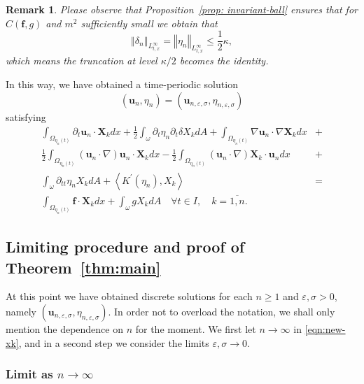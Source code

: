 \documentclass[10pt,a4paper]{article}
\newtheorem{remark}[theorem]{Remark}
\numberwithin{equation}{section}
\begin{document}
\begin{remark}
Please  observe that Proposition~\ref{prop: invariant-ball} ensures that for  $C\left(\mathbf{f},g\right)$ and $m^{2}$ sufficiently small  we obtain that
\[\left\Vert \delta_{n}\right\Vert _{L_{t,x}^{\infty}}=\left\Vert \eta_{n}\right\Vert _{L_{t,x}^{\infty}}\le \frac{1}{2}\kappa,\]
which means the truncation at level $\kappa/2$ becomes the identity.
\end{remark}
 In this way, we have obtained a time-periodic solution 
 \[
\left(\mathbf{u}_{n},\eta_{n}\right)=\left(\mathbf{u}_{n,\varepsilon,\sigma},\eta_{n,\varepsilon,\sigma}\right)
\] satisfying
\begin{equation}\label{eqn:new-xk}
\begin{aligned}\int_{\Omega_{\eta_{n}\left(t\right)}}\partial_{t}\mathbf{u}_{n}\cdot\mathbf{X}_{k}dx+\frac{1}{2}\int_{\omega}\partial_{t}\eta_{n}\partial_{t}\delta X_{k}dA+\int_{\Omega_{\eta_{n}\left(t\right)}}\nabla\mathbf{u}_{n}\cdot\nabla\mathbf{X}_{k}dx & +\\
\frac{1}{2}\int_{\Omega_{\eta_{n}\left(t\right)}}\left(\mathbf{u}_{n}\cdot\nabla\right)\mathbf{u}_{n}\cdot\mathbf{X}_{k}dx-\frac{1}{2}\int_{\Omega_{\eta_{n}\left(t\right)}}\left(\mathbf{u}_{n}\cdot\nabla\right)\mathbf{X}_{k}\cdot\mathbf{u}_{n}dx & +\\
\int_{\omega}\partial_{tt}\eta_{n}X_{k}dA+\left\langle K^{\prime}\left(\eta_{n}\right),X_{k}\right\rangle  & =\\
\int_{\Omega_{\eta_{n}\left(t\right)}}\mathbf{f}\cdot\mathbf{X}_{k}dx+\int_{\omega}gX_{k}dA\quad\forall t\in I,\quad k=\overline{1,n}.
\end{aligned}
\end{equation}

\subsection{Limiting procedure and proof of Theorem~\ref{thm:main}}\label{ssect:chap02-limit-compactness}
At this point we have obtained discrete solutions for each $n \ge 1$ and $\varepsilon, \sigma>0$, namely $\left(\mathbf{u}_{n,\varepsilon,\sigma},\eta_{n,\varepsilon,\sigma}\right)$.
In order not to overload the notation, we shall only mention the dependence on $n$ for the moment. We first let $n\to\infty$ in \eqref{eqn:new-xk}, and in a second step we consider the limits $\varepsilon, \sigma \to 0$.

\subsubsection{Limit as \texorpdfstring{$n\to\infty$}{n to infinity}}
\end{document}

